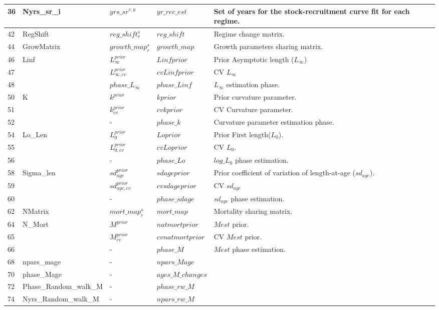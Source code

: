 \documentclass{article}
\begin{document}
\begin{table}[H]
\begin{tabular}{||  p{1.5cm} | p{1.9cm}  | p{1.9cm} | l | p{7cm} ||}
36 &  Nyrs\_sr\_i & $yrs\_sr^{r,y}$  & $yr\_rec\_est$ & Set of years for the stock-recruitment curve fit for each regime.\\ \hline
42 &  RegShift &  $reg\_shift^s_{r}$  & $reg\_shift$ & Regime change matrix. \\ \hline
44 &  GrowMatrix &  $growth\_map^s_{r}$ & $growth\_map$ & Growth parameters sharing matrix.\\ \hline
46 &  Linf &  $L_{\infty}^{prior}$ & $Linfprior$ & Prior  Asymptotic length ($L_{\infty}$)\\ %
47 &       &  $L_{\infty, cv}^{prior}$ & $cvLinfprior$ & CV $L_{\infty}$\\ %
48 &       & $phase\_L_{\infty}$  & $phase\_Linf$ & $L_{\infty}$ estimation phase.\\ \hline
50 &  K &  $k^{prior}$ & $kprior$ & Prior curvature parameter.\\ %
51 &    & $k^{prior}_{cv}$  & $cvkprior$ & CV Curvature parameter.\\ %
52 &    & -  & $phase\_k$ & Curvature parameter estimation phase.\\ \hline
54 &  Lo\_Len & $L_0^{prior}$ & $Loprior$ & Prior First length($L_0$).\\ %
55 &          &  $L_{0,cv}^{prior}$ & $cvLoprior$ & CV $L_0$.\\ %
56 &          & -  & $phase\_Lo$ & $log\_L_0$ phase estimation.\\ \hline
58 &  Sigma\_len  & $sd_{age}^{prior}$  &  
 $sdageprior$ & Prior coefficient of variation of length-at-age ($sd_{age}$).\\ %
59 &          & $sd_{age,cv}^{prior}$  & $cvsdageprior$ & CV $sd_{age}$\\ %
60 &          &  - & $phase\_sdage$  & $sd_{age}$ phase estimation.\\ \hline
62 &  NMatrix  & $mort\_map^s_r$   & $mort\_map$  & Mortality sharing matrix.\\ \hline
64 &  N\_Mort  &  $M^{prior}$ & $natmortprior$ & $Mest$ prior.
\\ %
65 &                      &  $M^{prior}_{cv}$ & $cvnatmortprior$ & CV $Mest$ prior.\\ %
66 &                      &  - & $phase\_M$  & $Mest$ phase estimation.\\ \hline
68 &  npars\_mage  & -  & $npars\_Mage$ & \\ \hline
70 &  phase\_Mage  &  - & $ages\_M\_changes$ &\\ \hline
72 &  Phase\_Random\_walk\_M	  &  - & $phase\_rw\_M$ &\\ \hline
74 &  Nyrs\_Random\_walk\_M  &  - & $npars\_rw\_M$ &\\ \hline


\end{tabular}
\end{table}
\end{document}
